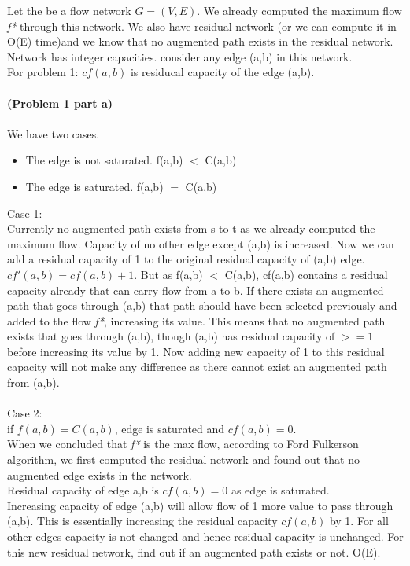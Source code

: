 


Let the be a flow network $G=(V,E)$. We already computed the maximum flow \textit{f*} through this network. We also have residual network (or we can compute it in O(E) time)and we know that no augmented path exists in the residual network.  
Network has integer capacities. consider any edge (a,b) in this network.\\ 
For problem 1: $cf(a,b) $ is residucal capacity of the edge (a,b).
\\
\\
\textbf{(Problem 1 part a)} \\
\\
We have two cases.
\begin{itemize}
	\item The edge is not saturated. f(a,b) $<$ C(a,b)
	\item The edge is saturated. f(a,b) $=$ C(a,b)
\end{itemize}

Case 1: \\
	Currently no augmented path exists from s to t as we already computed the maximum flow. Capacity of no other edge except (a,b) is increased. 
	Now we can add a residual capacity of 1 to the original residual capacity of (a,b) edge. $cf'(a,b) = cf(a,b) + 1. $
	But as f(a,b) $<$ C(a,b), cf(a,b) contains a residual capacity already that can carry flow from a to b. If there exists an augmented path that goes through (a,b) that path should have been selected previously and added to the flow \textit{f*}, increasing its value. This means that no augmented path exists that goes through (a,b), though (a,b) has residual capacity of $>=1$ before increasing its value by 1. Now adding new capacity of 1 to this residual capacity will not make any difference as there cannot exist an augmented path from (a,b). \\
\\
Case 2:\\
	if $f(a,b) = C(a,b)$, edge is saturated and $cf(a,b) = 0$. \\
	When we concluded that \textit{f*} is the max flow, according to Ford Fulkerson algorithm, we first computed the residual network and found out that no augmented edge exists in the network.\\ 
	Residual capacity of edge a,b is $cf(a,b) = 0$ as edge is saturated. \\
	Increasing capacity of edge (a,b) will allow flow of 1 more value to pass through (a,b). This is essentially increasing the residual capacity $cf(a,b)$ by 1. For all other edges capacity is not changed and hence residual capacity is unchanged. For this new residual network, find out if an augmented path exists or not. O(E). \\
	
